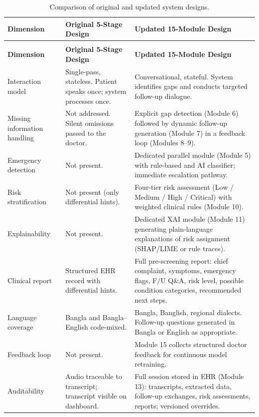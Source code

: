 \documentclass[12pt,a4paper]{article}
\begin{document}
\begin{longtable}{>{\raggedright\arraybackslash}p{3.8cm}
                  >{\raggedright\arraybackslash}p{4.9cm}
                  >{\raggedright\arraybackslash}p{4.9cm}}
\caption{Comparison of original and updated system designs.}
\label{tab:comparison}\\
\toprule
\textbf{Dimension} & \textbf{Original 5-Stage Design} & \textbf{Updated 15-Module Design} \\
\midrule
\endfirsthead
\multicolumn{3}{c}{\itshape Table~\ref{tab:comparison} continued}\\
\toprule
\textbf{Dimension} & \textbf{Original 5-Stage Design} & \textbf{Updated 15-Module Design} \\
\midrule
\endhead
\midrule\multicolumn{3}{r}{\itshape continued\ldots}\endfoot
\bottomrule\endlastfoot
Interaction model
  & Single-pass, stateless. Patient speaks once; system processes once.
  & Conversational, stateful. System identifies gaps and conducts targeted follow-up dialogue. \\
Missing information handling
  & Not addressed. Silent omissions passed to the doctor.
  & Explicit gap detection (Module 6) followed by dynamic follow-up generation (Module 7) in a feedback loop (Modules 8--9). \\
Emergency detection
  & Not present.
  & Dedicated parallel module (Module 5) with rule-based and AI classifier; immediate escalation pathway. \\
Risk stratification
  & Not present (only differential hints).
  & Four-tier risk assessment (Low / Medium / High / Critical) with weighted clinical rules (Module 10). \\
Explainability
  & Not present.
  & Dedicated XAI module (Module 11) generating plain-language explanations of risk assignment (SHAP/LIME or rule traces). \\
Clinical report
  & Structured EHR record with differential hints.
  & Full pre-screening report: chief complaint, symptoms, emergency flags, F/U Q\&A, risk level, possible condition categories, recommended next steps. \\
Language coverage
  & Bangla and Bangla--English code-mixed.
  & Bangla, Banglish, regional dialects. Follow-up questions generated in Bangla or English as appropriate. \\
Feedback loop
  & Not present.
  & Module 15 collects structured doctor feedback for continuous model retraining. \\
Auditability
  & Audio traceable to transcript; transcript visible on dashboard.
  & Full session stored in EHR (Module 13): transcripts, extracted data, follow-up exchanges, risk assessments, reports; versioned overrides. \\
\end{longtable}
\normalsize
\end{document}
